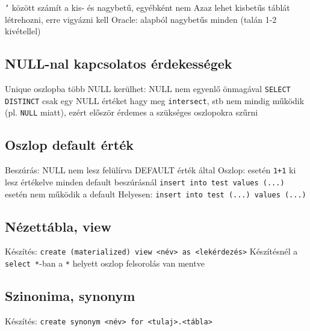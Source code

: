 \documentclass[12pt,a4paper]{article}
\begin{document}
\begin{outline}
	\1 \texttt{'} között számít a kis- és nagybetű, egyébként nem
	\1 Azaz lehet kisbetűs táblát létrehozni, erre vigyázni kell
	\1 Oracle: alapból nagybetűs minden (talán 1-2 kivétellel)
\end{outline}

\subsection{NULL-nal kapcsolatos érdekességek}

\begin{outline}
	\1 Unique oszlopba több NULL kerülhet: NULL nem egyenlő önmagával
	\1 \texttt{SELECT DISTINCT} csak egy NULL értéket hagy meg
	\1 \texttt{intersect}, stb nem mindig működik (pl. \texttt{NULL} miatt), ezért először érdemes a szükséges oszlopokra szűrni
\end{outline}

\pagebreak

\subsection{Oszlop default érték}

\begin{outline}
	\1 Beszúrás: NULL nem lesz felülírva DEFAULT érték által
	\1 Oszlop:  esetén \texttt{1+1} ki lesz értékelve minden default beszúrásnál
	\1 \texttt{insert into test values (...)} esetén nem működik a default
		\2 Helyesen: \texttt{insert into test (...) values (...)}
\end{outline}

\subsection{Nézettábla, view}

\begin{outline}
	\1 Készítés: \texttt{create (materialized) view <név> as <lekérdezés>}
	\1 Készítésnél a \texttt{select *}-ban a \texttt{*} helyett oszlop felsorolás van mentve
\end{outline}

\subsection{Szinonima, synonym}

\begin{outline}
	\1 Készítés: \texttt{create synonym <név> for <tulaj>.<tábla>}
\end{outline}
\end{document}
